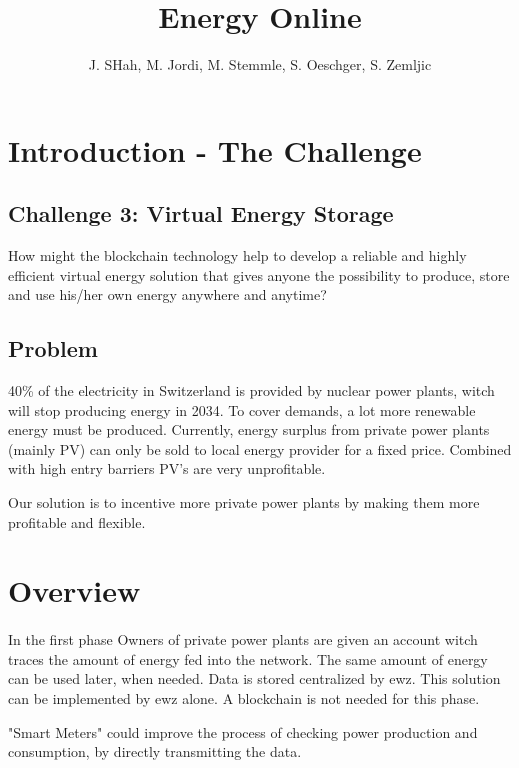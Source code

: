 \documentclass{scrartcl}
\begin{document}
	
	\title{Energy Online}
	\subtitle{}
	\author{J. SHah, M. Jordi, M. Stemmle, S. Oeschger, S. Zemljic}
	
	\maketitle
	
	\section{Introduction - The Challenge}
	
	\subsection{Challenge 3: Virtual Energy Storage}
	
	How might the blockchain technology help to develop a reliable and highly efficient virtual energy solution that gives anyone the possibility to produce, store and use his/her own energy anywhere and anytime?
	
	\subsection{Problem}
	40\% of the electricity in Switzerland is provided by nuclear power plants, witch will stop producing energy in 2034. To cover demands, a lot more renewable energy must be produced. 
	Currently, energy surplus from private power plants (mainly PV) can only be sold to local energy provider for a fixed price. Combined with high entry barriers PV's are very unprofitable. 
	
	Our solution is to incentive more private power plants by making them more profitable and flexible.
	
	\section{Overview}
	
	\paragraph{}
	In the first phase Owners of private power plants are given an account witch traces the amount of energy fed into the network. The same amount of energy can be used later, when needed. Data is stored centralized by ewz.  This solution can be implemented by ewz alone. A blockchain is not needed for this phase. 
	
	"Smart Meters" could improve the process of checking power production and consumption, by directly transmitting the data.
	
\end{document}
